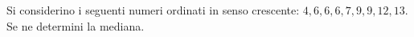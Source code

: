 Si considerino i seguenti numeri ordinati in senso crescente: 
$4, 6, 6, 6, 7, 9, 9, 12, 13$.
Se ne determini la mediana.